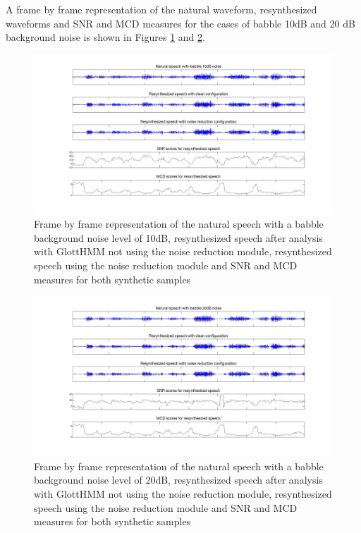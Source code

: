 A frame by frame representation of the natural waveform, resynthesized waveforms and SNR and MCD measures for the cases of babble 10dB and 20 dB background noise is shown in Figures \ref{fig:frame_by_frame_babble10} and \ref{fig:frame_by_frame_babble20}.

\begin{figure}[!htb]
\begin{adjustwidth}{-2.6cm}{}
\includegraphics[width=1.3\textwidth]{images/babble10_frame_by_frame.jpg}
\end{adjustwidth}
\caption{Frame by frame representation of the natural speech with a babble background noise level of 10dB, resynthesized speech after analysis with GlottHMM not using the noise reduction module, resynthesized speech using the noise reduction module and SNR and MCD measures for both synthetic samples}
\label{fig:frame_by_frame_babble10}
\end{figure}

\begin{figure}[!hb]
\begin{adjustwidth}{-2.6cm}{}
\includegraphics[width=1.3\textwidth]{images/babble20_frame_by_frame.jpg}
\end{adjustwidth}
\caption{Frame by frame representation of the natural speech with a babble background noise level of 20dB, resynthesized speech after analysis with GlottHMM not using the noise reduction module, resynthesized speech using the noise reduction module and SNR and MCD measures for both synthetic samples}
\label{fig:frame_by_frame_babble20}
\end{figure}

